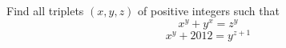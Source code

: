 Find all triplets $ (x,y,z) $ of positive integers such that\[ x^y + y^x = z^y \]\[ x^y + 2012 = y^{z+1} \]